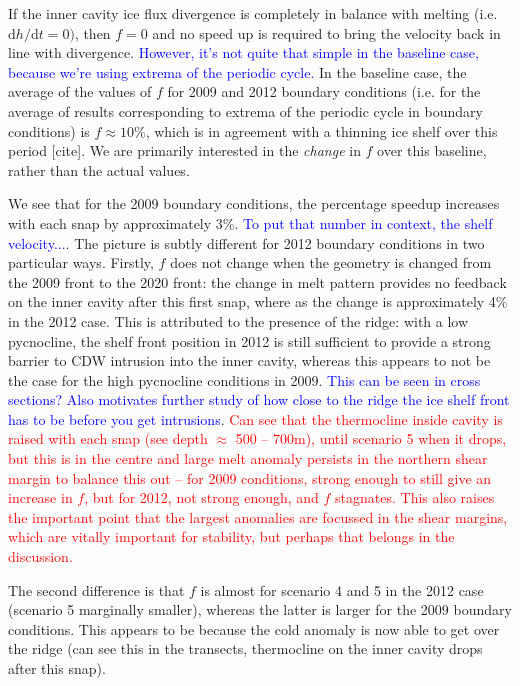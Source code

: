 \documentclass[draft]{agujournal2019}
\newcommand{\red}[1]{\textcolor{red}{#1}}
\newcommand{\blue}[1]{\textcolor{blue}{#1}}
\begin{document}
If the inner cavity  ice flux divergence is completely in balance with melting (i.e. $\mathrm{d}h/\mathrm{d}t = 0)$, then $f = 0$ and no speed up is required to bring the velocity back in line with divergence. \blue{However, it's not quite that simple in the baseline case, because we're using extrema of the periodic cycle.} In the baseline case, the average of the values of $f$ for 2009 and 2012 boundary conditions (i.e. for the average of results corresponding to extrema of the periodic cycle in boundary conditions) is $f \approx 10\%$, which is in agreement with a thinning ice shelf over this period [cite]. We are primarily interested in the \emph{change} in $f$ over this baseline, rather than the actual values. 

We see that for the 2009 boundary conditions, the percentage speedup increases with each snap by approximately 3\%. \blue{To put that number in context, the shelf velocity...}. The picture is subtly different for 2012 boundary conditions in two particular ways. Firstly, $f$ does not change when the geometry is changed from the 2009 front to the 2020 front: the change in melt pattern provides no feedback on the inner cavity after this first snap, where as the change is approximately 4\% in the 2012 case. This is attributed to the presence of the ridge: with a low pycnocline, the shelf front position in 2012 is still sufficient to provide a strong barrier to CDW intrusion into the inner cavity, whereas this appears to not be the case for the high pycnocline conditions in 2009. \blue{This can be seen in cross sections? Also motivates further study of how close to the ridge the ice shelf front has to be before you get intrusions}. \red{Can see that the thermocline inside cavity is raised with each snap (see depth $\approx$ 500 -- 700m), until scenario 5 when it drops, but this is in the centre and large melt anomaly persists in the northern shear margin to balance this out -- for 2009 conditions, strong enough to still give an increase in $f$, but for 2012, not strong enough, and $f$ stagnates. This also raises the important point that the largest anomalies are focussed in the shear margins, which are vitally important for stability, but perhaps that belongs in the discussion.}

The second difference is that $f$ is almost for scenario 4 and 5 in the 2012 case (scenario 5 marginally smaller), whereas the latter is larger for the 2009 boundary conditions. This appears to be because the cold anomaly is now able to get over the ridge (can see this in the transects, thermocline on the inner cavity drops after this snap).
\end{document}
